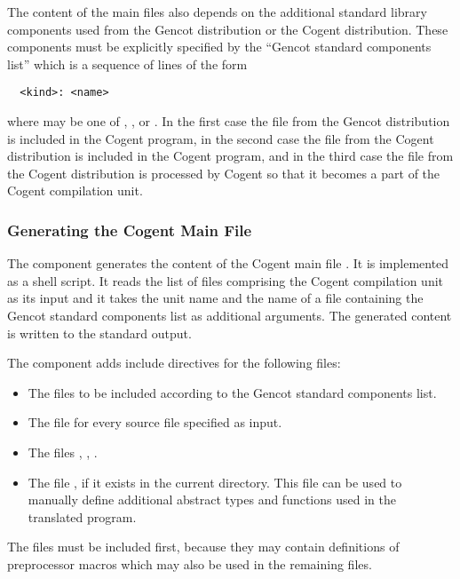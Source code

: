The content of the main files also depends on the additional standard library components used from the Gencot distribution
or the Cogent distribution. These components must be explicitly specified by the ``Gencot standard components list'' which
is a sequence of lines of the form
\begin{verbatim}
  <kind>: <name>
\end{verbatim}
where  may be one of , , or . In the first case the file
 from the Gencot distribution is included in the Cogent program, in the 
second case the file  from the Cogent distribution is included in the 
Cogent program, and in the third case the file  from the Cogent distribution 
is processed by Cogent so that it becomes a part of the Cogent compilation unit.

\subsubsection{Generating the Cogent Main File}

The component  generates the content of the Cogent main file . 
It is implemented as a shell script. It reads the list of
 files comprising the Cogent compilation unit as its input and it takes the unit name 
and the name of a file containing the Gencot standard components list as additional arguments. The generated content 
is written to the standard output. 

The component adds include directives for the following files:
\begin{itemize}
\item The files to be included according to the Gencot standard components list.
\item The file  for every source file  specified as input.
\item The files , , .
\item The file , if it exists in the current directory. This file can be used to
manually define additional abstract types and functions used in the translated program.
\end{itemize}

The files  must be included first, because they may contain definitions of preprocessor macros
which may also be used in the remaining files.

